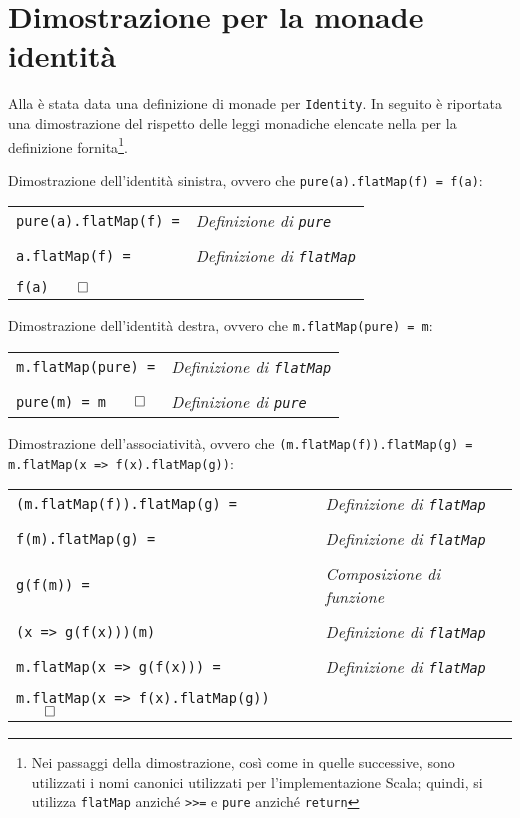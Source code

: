 \section{Dimostrazione per la monade identità}
\label{dimostrazione-per-la-monade-identita}

Alla  è stata data una definizione di monade per \lstinline{Identity}. In seguito è riportata una dimostrazione del rispetto delle leggi monadiche elencate nella  per la definizione fornita\footnote{Nei passaggi della dimostrazione, così come in quelle successive, sono utilizzati i nomi canonici utilizzati per l'implementazione Scala; quindi, si utilizza \lstinline{flatMap} anziché \lstinline{>>=} e \lstinline{pure} anziché \lstinline{return}}.

Dimostrazione dell'identità sinistra, ovvero che \lstinline{pure(a).flatMap(f) = f(a)}:

\begin{tabularx}{\textwidth}{ll}
  \lstinline{pure(a).flatMap(f) =} & \emph{Definizione di \lstinline{pure}} \\
  \\
  \lstinline{a.flatMap(f) =} & \emph{Definizione di \lstinline{flatMap}}    \\
  \\
  \lstinline{f(a)}$\qed$ &
\end{tabularx}

Dimostrazione dell'identità destra, ovvero che \lstinline{m.flatMap(pure) = m}:

\begin{tabularx}{\textwidth}{ll}
  \lstinline{m.flatMap(pure) =} & \emph{Definizione di \lstinline{flatMap}} \\
  \\
  \lstinline{pure(m) = m}$\qed$ & \emph{Definizione di \lstinline{pure}}    \\
\end{tabularx}

Dimostrazione dell'associatività, ovvero che \lstinline{(m.flatMap(f)).flatMap(g) = m.flatMap(x => f(x).flatMap(g))}:

\begin{tabularx}{\textwidth}{ll}
  \lstinline{(m.flatMap(f)).flatMap(g) =} & \emph{Definizione di \lstinline{flatMap}} \\
  \\
  \lstinline{f(m).flatMap(g) =} & \emph{Definizione di \lstinline{flatMap}}           \\
  \\
  \lstinline{g(f(m)) =} & \emph{Composizione di funzione}                             \\
  \\
  \lstinline{(x => g(f(x)))(m)} & \emph{Definizione di \lstinline{flatMap}}           \\
  \\
  \lstinline{m.flatMap(x => g(f(x))) =} & \emph{Definizione di \lstinline{flatMap}}   \\
  \\
  \lstinline{m.flatMap(x => f(x).flatMap(g))}$\qed$ &
\end{tabularx}


